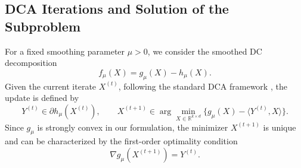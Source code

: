 \documentclass[11pt]{article}
\theoremstyle{definition}
\newcommand{\1}{\mathbf{1}}
\begin{document}

\subsection{DCA Iterations and Solution of the Subproblem}

For a fixed smoothing parameter $\mu > 0$, we consider the smoothed DC decomposition $$f_\mu(X) = g_\mu(X) - h_\mu(X).$$ Given the current iterate $X^{(t)}$, following the standard DCA framework \cite{LeThi2018,LeThi2024,LeThi1996}, the update is defined by
\begin{equation}\label{eq:dca-step}
Y^{(t)} \in \partial h_\mu(X^{(t)}), \qquad
X^{(t+1)} \in \arg\min_{X \in \mathbb{R}^{k \times d}} \{ g_\mu(X) - \langle Y^{(t)}, X \rangle \}.
\end{equation}
Since $g_\mu$ is strongly convex in our formulation, the minimizer $X^{(t+1)}$ is unique and can be characterized by the first-order optimality condition 
\begin{equation}\label{condition}
\nabla g_\mu(X^{(t+1)}) = Y^{(t)}.    
\end{equation}
\end{document}

